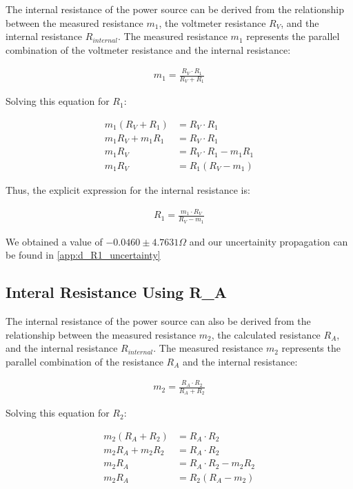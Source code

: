 \documentclass{article} %
\begin{document}
The internal resistance of the power source can be derived from the relationship between the measured resistance $m_1$, the voltmeter resistance $R_V$, and the internal resistance $R_{internal}$. 
The measured resistance $m_1$ represents the parallel combination of the voltmeter resistance and the internal resistance:

\begin{align*}
m_1 = \frac{R_V \cdot R_{1}}{R_V + R_{1}}
\end{align*}

Solving this equation for $R_{1}$:

\begin{align*}
m_1 (R_V + R_{1}) &= R_V \cdot R_{1} \\
m_1 R_V + m_1 R_{1} &= R_V \cdot R_{1} \\
m_1 R_V &= R_V \cdot R_{1} - m_1 R_{1} \\
m_1 R_V &= R_{1} (R_V - m_1)
\end{align*}

Thus, the explicit expression for the internal resistance is:

\begin{align*}
R_{1} = \frac{m_1 \cdot R_V}{R_V - m_1}
\end{align*}

We obtained a value of $-0.0460 \pm 4.7631 \Omega$ and our uncertainity propagation can be found in \ref{app:d_R1_uncertainty}

\subsection{Interal Resistance Using R\_A}

The internal resistance of the power source can also be derived from the relationship between the measured resistance $m_2$, the calculated resistance $R_A$, and the internal resistance $R_{internal}$. 
The measured resistance $m_2$ represents the parallel combination of the resistance $R_A$ and the internal resistance:

\begin{align*}
m_2 = \frac{R_A \cdot R_{2}}{R_A + R_{2}}
\end{align*}

Solving this equation for $R_{2}$:

\begin{align*}
m_2 (R_A + R_{2}) &= R_A \cdot R_{2} \\
m_2 R_A + m_2 R_{2} &= R_A \cdot R_{2} \\
m_2 R_A &= R_A \cdot R_{2} - m_2 R_{2} \\
m_2 R_A &= R_{2} (R_A - m_2)
\end{align*}
\end{document}
